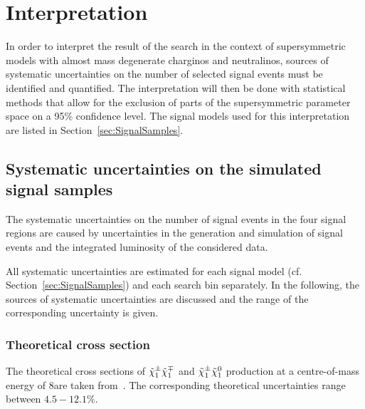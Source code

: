 \FloatBarrier
\chapter{Interpretation}
\label{sec:Interpretation}
In order to interpret the result of the search in the context of supersymmetric models with almost mass degenerate charginos and neutralinos, sources of systematic uncertainties on the number of selected signal events must be identified and quantified.
The interpretation will then be done with statistical methods that allow for the exclusion of parts of the supersymmetric parameter space on a 95\% confidence level.
The signal models used for this interpretation are listed in Section~\ref{sec:SignalSamples}.

\section{Systematic uncertainties on the simulated signal samples}
The systematic uncertainties on the number of signal events in the four signal regions are caused by uncertainties in the generation and simulation of signal events and the integrated luminosity of the considered data.

All systematic uncertainties are estimated for each signal model (cf. Section~\ref{sec:SignalSamples}) and each search bin separately.
In the following, the sources of systematic uncertainties are discussed and the range of the corresponding uncertainty is given.

\subsection*{Theoretical cross section}
The theoretical cross sections of $\tilde{\chi}^{\pm}_{1}\tilde{\chi}^{\mp}_{1}$ and $\tilde{\chi}^{\pm}_{1}\tilde{\chi}^{0}_{1}$ production at a centre-of-mass energy of 8\tev are taken from~\cite{bib:SignalCrossSection_2012,bib:SignalCrossSection_2013}.
The corresponding theoretical uncertainties range between $4.5-12.1\%$.

